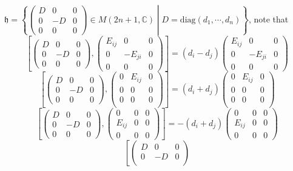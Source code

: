 \documentclass[10pt]{article}
\newcommand{\<}[1]{\langle #1 \rangle}
\begin{document}
$\mathfrak{h}=\left\{\begin{pmatrix}
D&0&0 \\
0&-D&0 \\
0&0&0
\end{pmatrix}\in M(2n+1,\mathbb C)\middle| D=\mathrm{diag}(d_1,\cdots,d_n)\right\}$, note that $$\left[\begin{pmatrix}
D&0&0 \\
0&-D&0 \\
0&0&0
\end{pmatrix},\begin{pmatrix}
E_{ij}&0&0 \\
0&-E_{ji}&0 \\
0&0&0
\end{pmatrix}\right]=(d_i-d_j)\begin{pmatrix}
E_{ij}&0&0 \\
0&-E_{ji}&0 \\
0&0&0
\end{pmatrix}$$ $$\left[\begin{pmatrix}
D&0&0 \\
0&-D&0 \\
0&0&0
\end{pmatrix},\begin{pmatrix}
0&E_{ij}&0 \\
0&0&0 \\
0&0&0 \\
\end{pmatrix}\right]=(d_i+d_j)\begin{pmatrix}
0&E_{ij}&0 \\
0&0&0 \\
0&0&0 \\
\end{pmatrix}$$ $$\left[\begin{pmatrix}
D&0&0 \\
0&-D&0 \\
0&0&0
\end{pmatrix},\begin{pmatrix}
0&0&0 \\
E_{ij}&0&0 \\
0&0&0
\end{pmatrix}\right]=-(d_i+d_j)\begin{pmatrix}
0&0&0 \\
E_{ij}&0&0 \\
0&0&0
\end{pmatrix}$$ $$\left[\begin{pmatrix}
D&0&0 \\
0&-D&0 \\

\end{pmatrix}$$
\end{document}
